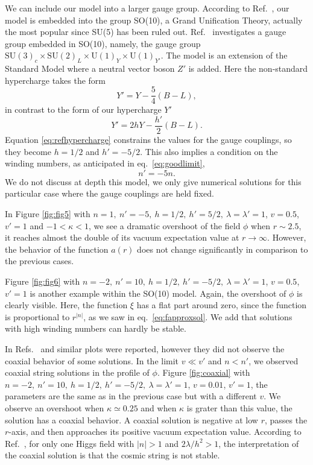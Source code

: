 We can include our model into a larger gauge group. According to Ref.\ \cite{Fritzsch75}, our model is embedded into the group SO(10), a Grand Unification Theory, actually the most popular since SU(5) has been ruled out. Ref.\ \cite{BUCHMULLER1991395} investigates a gauge group embedded in SO(10), namely, the gauge group $\text{SU}(3)_c\times \text{SU}(2)_L\times\text{U}(1)_Y \times \text{U}(1)_{Y'}$. The model is an extension of the Standard Model where a neutral vector boson $Z'$ is added. 
Here the non-standard hypercharge takes the form
\begin{equation}
	\label{eq:refhypercharge}
	Y' = Y - \frac{5}{4}(B-L),
\end{equation}
in contrast to the form of our hypercharge $Y'$
\begin{equation}
	Y' = 2hY - \frac{h'}{2}(B-L).
\end{equation}
Equation \eqref{eq:refhypercharge} constrains the values for the gauge couplings, so they become $h = 1/2$ and $h'= -5/2$. This also implies a condition on the winding numbers, as anticipated in eq.\ \eqref{eq:goodlimit},
\begin{equation}
	n' = -5n.
\end{equation}
We do not discuss at depth this model, we only give numerical solutions for this particular case where the gauge couplings are held fixed.

In Figure \ref{fig:fig5} with $n=1,\ n'=-5,\ h=1/2,\ h'=5/2,\ \lambda=\lambda'=1$, $v = 0.5$, $v'=1$ and $-1<\kappa<1$, we see a dramatic overshoot of the field $\phi$ when $r\sim 2.5$, it reaches almost the double of its vacuum expectation value at $r\to\infty$. However, the behavior of the function $a(r)$ does not change significantly in comparison to the previous cases. 

Figure \ref{fig:fig6} with $n=-2,\ n'=10,\ h=1/2,\ h'=-5/2,\ \lambda=\lambda'=1$, $v = 0.5$, $v'=1$ is another example within the SO(10) model. Again, the overshoot of $\phi$ is clearly visible. Here, the function $\xi$ has a flat part around zero, since the function is proportional to $r^{|n|}$, as we saw in eq.\ \eqref{eq:fapproxsol}. We add that solutions with high winding numbers can hardly be stable. 

In Refs.\ \cite{victor2022} and \cite{bietenholz2022} similar plots were reported, however they did not observe the coaxial behavior of some solutions. In the limit $v\ll v'$ and $n < n'$, we observed coaxial string solutions in the profile of $\phi$. Figure \ref{fig:coaxial} with $n=-2,\ n'=10,\ h=1/2,\ h'=-5/2,\ \lambda=\lambda'=1$, $v = 0.01$, $v'=1$, the parameters are the same as in the previous case but with a different $v$. We observe an overshoot when $\kappa \simeq 0.25$ and when $\kappa$ is grater than this value, the solution has a coaxial behavior. A coaxial solution is negative at low $r$, passes the $r$-axis, and then approaches its positive vacuum expectation value. According to Ref.\ \cite{bogo1975}, for only one Higgs field with $|n|>1$ and $2\lambda/h^2 > 1$, the interpretation of the coaxial solution is that the cosmic string is not stable. 

